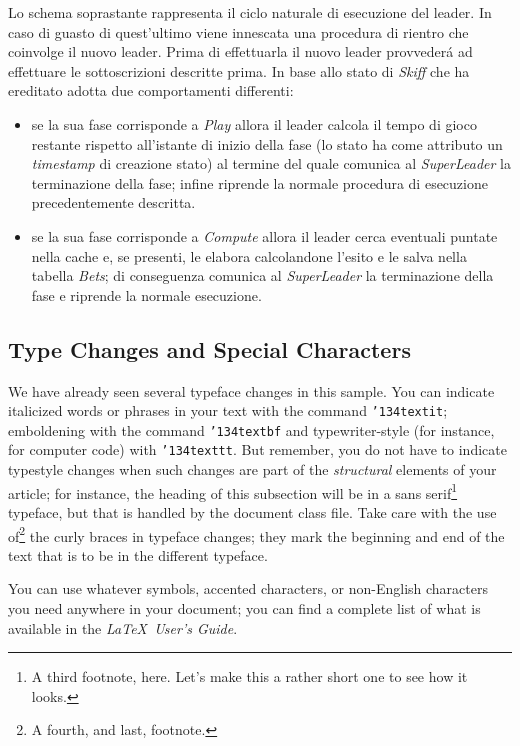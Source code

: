 \documentclass{sig-alternate-05-2015}
\begin{document}
Lo schema soprastante rappresenta il ciclo naturale di esecuzione del leader. In caso di guasto di quest'ultimo viene innescata una procedura di rientro che coinvolge il nuovo leader. Prima di effettuarla il nuovo leader provveder\'a ad effettuare le sottoscrizioni descritte prima. In base allo stato di \textit{Skiff} che ha ereditato adotta due comportamenti differenti:
\begin{itemize}
\item se la sua fase corrisponde a \textit{Play} allora il leader calcola il tempo di gioco restante rispetto all'istante di inizio della fase (lo stato ha come attributo un \textit{timestamp} di creazione stato) al termine del quale comunica al \textit{SuperLeader} la terminazione della fase; infine riprende la normale procedura di esecuzione precedentemente descritta. 
\item se la sua fase corrisponde a \textit{Compute} allora il leader cerca eventuali puntate nella cache e, se presenti, le elabora calcolandone l'esito e le salva nella tabella \textit{Bets}; di conseguenza comunica al \textit{SuperLeader} la terminazione della fase e riprende la normale esecuzione. 
\end{itemize}


\subsection{Type Changes and {\subsecit Special} Characters}
We have already seen several typeface changes in this sample.  You
can indicate italicized words or phrases in your text with
the command \texttt{{\char'134}textit}; emboldening with the
command \texttt{{\char'134}textbf}
and typewriter-style (for instance, for computer code) with
\texttt{{\char'134}texttt}.  But remember, you do not
have to indicate typestyle changes when such changes are
part of the \textit{structural} elements of your
article; for instance, the heading of this subsection will
be in a sans serif\footnote{A third footnote, here.
Let's make this a rather short one to
see how it looks.} typeface, but that is handled by the
document class file. Take care with the use
of\footnote{A fourth, and last, footnote.}
the curly braces in typeface changes; they mark
the beginning and end of
the text that is to be in the different typeface.

You can use whatever symbols, accented characters, or
non-English characters you need anywhere in your document;
you can find a complete list of what is
available in the \textit{\LaTeX\
User's Guide}\cite{Lamport:LaTeX}.
\end{document}
